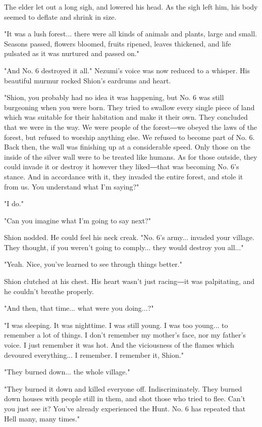 The elder let out a long sigh, and lowered his head. As the sigh left
him, his body seemed to deflate and shrink in size.

"It was a lush forest... there were all kinds of animals and plants,
large and small. Seasons passed, flowers bloomed, fruits ripened, leaves
thickened, and life pulsated as it was nurtured and passed on."

"And No. 6 destroyed it all." Nezumi's voice was now reduced to a
whisper. His beautiful murmur rocked Shion's eardrums and heart.

"Shion, you probably had no idea it was happening, but No. 6 was still
burgeoning when you were born. They tried to swallow every single piece
of land which was suitable for their habitation and make it their own.
They concluded that we were in the way. We were people of the forest―we
obeyed the laws of the forest, but refused to worship anything else. We
refused to become part of No. 6. Back then, the wall was finishing up at
a considerable speed. Only those on the inside of the silver wall were
to be treated like humans. As for those outside, they could invade it or
destroy it however they liked―that was becoming No. 6's stance. And in
accordance with it, they invaded the entire forest, and stole it from
us. You understand what I'm saying?"

"I do."

"Can you imagine what I'm going to say next?"

Shion nodded. He could feel his neck creak. "No. 6's army... invaded
your village. They thought, if you weren't going to comply... they would
destroy you all..."

"Yeah. Nice, you've learned to see through things better."

Shion clutched at his chest. His heart wasn't just racing―it was
palpitating, and he couldn't breathe properly.

"And then, that time... what were you doing...?"

"I was sleeping. It was nighttime. I was still young. I was too young...
to remember a lot of things. I don't remember my mother's face, nor my
father's voice. I just remember it was hot. And the viciousness of the
flames which devoured everything... I remember. I remember it, Shion."

"They burned down... the whole village."

"They burned it down and killed everyone off. Indiscriminately. They
burned down houses with people still in them, and shot those who tried
to flee. Can't you just see it? You've already experienced the Hunt. No.
6 has repeated that Hell many, many times."

